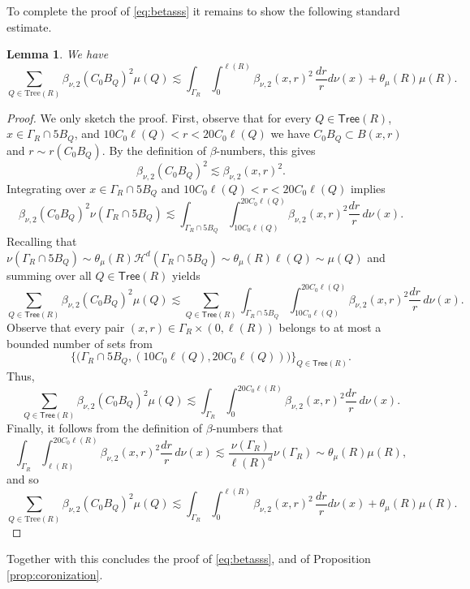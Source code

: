 \documentclass[11pt,reqno]{amsart}
\newcommand{\Tr}{\mathrm{Tree}}
\newcommand{\Tree}{\mathsf{Tree}}
\newcommand{\fr}[2]{\frac{#1}{#2}}
\newtheorem{lemma}[theorem]{Lemma}
\theoremstyle{definition}
\theoremstyle{remark}
\numberwithin{equation}{section}
\newcommand{\hd}{\mathcal{H}^d}
\theoremstyle{theorem}
\theoremstyle{definition}
\theoremstyle{remark}
\numberwithin{equation}{section}
\begin{document}
 To complete the proof of \eqref{eq:betasss} it remains to show the following standard estimate.
 \begin{lemma}
     We have
      \begin{equation*}
     \sum_{Q\in\Tr(R)}\beta_{\nu,2}(C_0B_Q)^2\mu(Q) \lesssim \int_{\Gamma_R}\int_0^{\ell(R)} \beta_{\nu,2}(x,r)^2\, \fr{dr}{r}d\nu(x) + \theta_\mu(R)\mu(R).
 \end{equation*}
 \end{lemma}
\begin{proof}
     We only sketch the proof. First, observe that for every $Q\in\Tree(R)$, $x\in \Gamma_R\cap 5B_Q$, and $10C_0\ell(Q)<r<20C_0\ell(Q)$ we have $C_0B_Q\subset B(x,r)$ and $r\sim r(C_0B_Q).$ By the definition of $\beta$-numbers, this gives
 \begin{equation*}
     \beta_{\nu,2}(C_0B_Q)^2\lesssim \beta_{\nu,2}(x,r)^2.
 \end{equation*}
 Integrating over $x\in \Gamma_R\cap 5B_Q$ and $10C_0\ell(Q)<r<20C_0\ell(Q)$ implies
 \begin{equation*}
     \beta_{\nu,2}(C_0B_Q)^2\nu(\Gamma_R\cap 5B_Q)\lesssim \int_{\Gamma_R\cap 5B_Q}\int_{10C_0\ell(Q)}^{20C_0\ell(Q)} \beta_{\nu,2}(x,r)^2\frac{dr}{r}\, d\nu(x).
 \end{equation*}
 Recalling that $\nu(\Gamma_R\cap 5B_Q)\sim\theta_\mu(R)\hd(\Gamma_R\cap 5B_Q)\sim\theta_\mu(R)\ell(Q)\sim\mu(Q)$ and summing over all $Q\in\Tree(R)$ yields
 \begin{equation*}
     \sum_{Q\in\Tree(R)}\beta_{\nu,2}(C_0B_Q)^2\mu(Q)\lesssim \sum_{Q\in\Tree(R)}\int_{\Gamma_R\cap 5B_Q}\int_{10C_0\ell(Q)}^{20C_0\ell(Q)} \beta_{\nu,2}(x,r)^2\frac{dr}{r}\, d\nu(x).
 \end{equation*}
 Observe that every pair $(x,r)\in\Gamma_R\times (0,\ell(R))$ belongs to at most a bounded number of sets from 
 \begin{equation*}
     \big\{\big(\Gamma_R\cap 5B_Q, (10C_0\ell(Q),20C_0\ell(Q))\big)\big\}_{Q\in\Tree(R)}.
 \end{equation*}
 Thus,
 \begin{equation*}
     \sum_{Q\in\Tree(R)}\beta_{\nu,2}(C_0B_Q)^2\mu(Q)\lesssim \int_{\Gamma_R}\int_{0}^{20C_0\ell(R)} \beta_{\nu,2}(x,r)^2\frac{dr}{r}\, d\nu(x).
 \end{equation*}
 Finally, it follows from the definition of $\beta$-numbers that
 \begin{equation*}
     \int_{\Gamma_R}\int_{\ell(R)}^{20C_0\ell(R)} \beta_{\nu,2}(x,r)^2\frac{dr}{r}\, d\nu(x) \lesssim \frac{\nu(\Gamma_R)}{\ell(R)^d}\nu(\Gamma_R)\sim \theta_\mu(R)\mu(R),
 \end{equation*}
 and so
 \begin{equation*}
     \sum_{Q\in\Tr(R)}\beta_{\nu,2}(C_0B_Q)^2\mu(Q) \lesssim \int_{\Gamma_R}\int_0^{\ell(R)} \beta_{\nu,2}(x,r)^2\, \fr{dr}{r}d\nu(x) + \theta_\mu(R)\mu(R).
 \end{equation*}
\end{proof}
Together with  this concludes the proof of \eqref{eq:betasss}, and of Proposition \ref{prop:coronization}.
\end{document}
